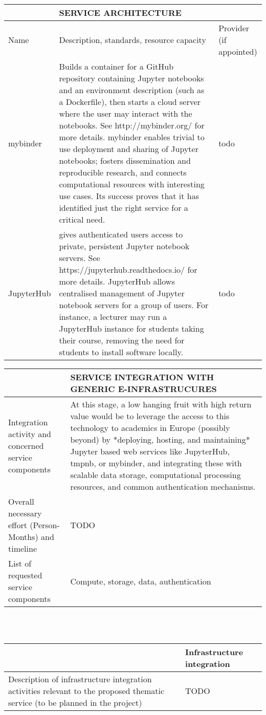 \begin{tabular}{|p{2cm}|p{8cm}|p{4cm}|}
&SERVICE ARCHITECTURE&
\\\hline
Name&Description, standards, resource capacity&Provider (if appointed)
\\\hline
mybinder&Builds a container for a GitHub repository containing
Jupyter notebooks and an environment description (such as a
Dockerfile), then starts a cloud server where the user may interact
with the notebooks. See http://mybinder.org/ for more details.
mybinder enables trivial to use deployment and sharing of
Jupyter notebooks; fosters dissemination and reproducible research,
and connects computational resources with interesting use cases.
Its success proves that it has identified just the right service for
a critical need.&todo
\\\hline
JupyterHub&gives authenticated users access to private, persistent Jupyter
notebook servers. See https://jupyterhub.readthedocs.io/ for more details.
JupyterHub allows centralised management of Jupyter notebook servers
for a group of users. For instance, a lecturer may run a JupyterHub instance for
students taking their course, removing the need for students to install software
locally.&todo
\\\hline
\end{tabular}

\begin{tabular}{|p{7cm}|p{7cm}|}
&SERVICE INTEGRATION WITH GENERIC E-INFRASTRUCURES
\\\hline
Integration activity and concerned service components&At this stage, a low hanging fruit with high return value would be to
leverage the access to this technology to academics in Europe
(possibly beyond) by *deploying, hosting, and maintaining* Jupyter
based web services like JupyterHub, tmpnb, or mybinder, and integrating these
with scalable data storage, computational processing resources, and common
authentication mechanisms.
\\\hline
Overall necessary effort (Person-Months) and timeline&TODO
\\\hline
List of requested service components&Compute, storage, data, authentication
\\\hline
\end{tabular}
\\\\
\begin{tabular}{|p{7cm}|l|}
  &Infrastructure integration
  \\\hline
  Description of infrastructure integration activities relevant to the proposed thematic service (to be planned in the project)&TODO
  \\\hline
\end{tabular}

